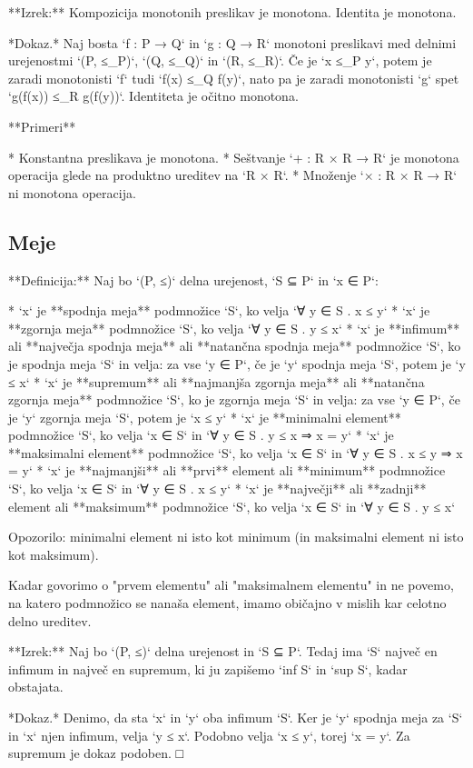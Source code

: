 **Izrek:** Kompozicija monotonih preslikav je monotona. Identita je monotona.

*Dokaz.* Naj bosta `f : P → Q` in `g : Q → R` monotoni preslikavi med delnimi
urejenostmi `(P, ≤_P)`, `(Q, ≤_Q)` in `(R, ≤_R)`. Če je `x ≤_P y`, potem je
zaradi monotonisti `f` tudi `f(x) ≤_Q f(y)`, nato pa je zaradi monotonisti `g`
spet `g(f(x)) ≤_R g(f(y))`. Identiteta je očitno monotona.

**Primeri**

* Konstantna preslikava je monotona.
* Seštvanje `+ : R × R → R` je monotona operacija glede na produktno ureditev na `R × R`.
* Množenje `× : R × R → R` ni monotona operacija.


\subsection{Meje}

**Definicija:** Naj bo `(P, ≤)` delna urejenost, `S ⊆ P` in `x ∈ P`:

* `x` je **spodnja meja** podmnožice `S`, ko velja `∀ y ∈ S . x ≤ y`
* `x` je **zgornja meja** podmnožice `S`, ko velja `∀ y ∈ S . y ≤ x`
* `x` je **infimum** ali **največja spodnja meja** ali **natančna spodnja meja**
  podmnožice `S`, ko je spodnja meja `S` in velja: za vse `y ∈ P`, če je `y` spodnja meja
  `S`, potem je `y ≤ x`
* `x` je **supremum** ali **najmanjša zgornja meja** ali **natančna zgornja meja**
  podmnožice `S`, ko je zgornja meja `S` in velja: za vse `y ∈ P`, če je `y` zgornja meja
  `S`, potem je `x ≤ y`
* `x` je **minimalni element** podmnožice `S`, ko velja `x ∈ S` in `∀ y ∈ S . y ≤ x ⇒ x = y`
* `x` je **maksimalni element** podmnožice `S`, ko velja `x ∈ S` in `∀ y ∈ S . x ≤ y ⇒ x = y`
* `x` je **najmanjši** ali **prvi** element ali **minimum** podmnožice `S`, ko velja `x ∈ S` in `∀ y ∈ S . x ≤ y`
* `x` je **največji** ali **zadnji** element ali **maksimum** podmnožice `S`, ko velja `x ∈ S` in `∀ y ∈ S . y ≤ x`

Opozorilo: minimalni element ni isto kot minimum (in maksimalni element ni isto kot maksimum).

Kadar govorimo o "prvem elementu" ali "maksimalnem elementu" in ne povemo, na
katero podmnožico se nanaša element, imamo običajno v mislih kar celotno delno
ureditev.

**Izrek:** Naj bo `(P, ≤)` delna urejenost in `S ⊆ P`. Tedaj ima `S` največ en
infimum in največ en supremum, ki ju zapišemo `inf S` in `sup S`, kadar obstajata.

*Dokaz.* Denimo, da sta `x` in `y` oba infimum `S`. Ker je `y` spodnja meja za
`S` in `x` njen infimum, velja `y ≤ x`. Podobno velja `x ≤ y`, torej `x = y`. Za
supremum je dokaz podoben. □

